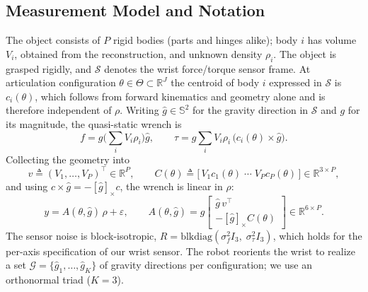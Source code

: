 %
%
%

\subsection{Measurement Model and Notation}
\label{sec:model}

The object consists of $P$ rigid bodies (parts and hinges alike); body $i$ has
volume $V_i$, obtained from the reconstruction, and unknown density $\rho_i$.
The object is grasped rigidly, and $\mathcal{S}$ denotes the wrist force/torque
sensor frame. At articulation configuration $\theta\in\Theta\subset\mathbb{R}^J$
the centroid of body $i$ expressed in $\mathcal{S}$ is $c_i(\theta)$, which
follows from forward kinematics and geometry alone and is therefore independent
of $\rho$. Writing $\hat g\in\mathbb{S}^2$ for the gravity direction in
$\mathcal{S}$ and $g$ for its magnitude, the quasi-static wrench is
%
\begin{equation}
f = g\Big(\textstyle\sum_i V_i\rho_i\Big)\hat g,
\qquad
\tau = g\sum_i V_i\rho_i\,\big(c_i(\theta)\times\hat g\big).
\end{equation}
%
Collecting the geometry into
%
\begin{equation}
v \triangleq (V_1,\dots,V_P)^{\!\top}\!\in\mathbb{R}^{P},
\qquad
C(\theta) \triangleq \big[\,V_1c_1(\theta)\;\cdots\;V_Pc_P(\theta)\,\big]
\in\mathbb{R}^{3\times P},
\end{equation}
%
and using $c\times\hat g=-[\hat g]_\times c$, the wrench is linear in $\rho$:
%
\begin{equation}
y = A(\theta,\hat g)\,\rho + \varepsilon,
\qquad
A(\theta,\hat g) = g\begin{bmatrix}\hat g\,v^{\!\top}\\[2pt]
-[\hat g]_\times C(\theta)\end{bmatrix}\in\mathbb{R}^{6\times P}.
\label{eq:regressor}
\end{equation}
%
The sensor noise is block-isotropic,
$R=\mathrm{blkdiag}(\sigma_f^2 I_3,\;\sigma_\tau^2 I_3)$, which holds for the
per-axis specification of our wrist sensor. The robot reorients the wrist to
realize a set $\mathcal{G}=\{\hat g_1,\dots,\hat g_K\}$ of gravity directions
per configuration; we use an orthonormal triad ($K=3$).

